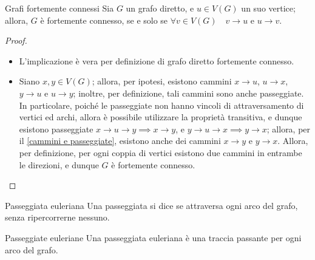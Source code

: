 \documentclass[a4paper, 12pt]{report}
\begin{document}
    \begin{framedlem}{Grafi fortemente connessi}
        Sia $G$ un grafo diretto, e $u \in V(G)$ un suo vertice; allora, $G$ è fortemente connesso, se e solo se $\forall v \in V(G) \quad v \rightarrow u$ e $u \rightarrow v$.
    \end{framedlem}

    \begin{proof}
        \hspace{0.7cm}
        \begin{itemize}
            \item[]  L'implicazione è vera per definizione di grafo diretto fortemente connesso.
            \item[]  Siano $x, y \in V(G)$; allora, per ipotesi, esistono cammini $x \rightarrow u$, $u \rightarrow x$, $y \rightarrow u$ e $u \rightarrow y$; inoltre, per definizione, tali cammini sono anche passeggiate. In particolare, poiché le passeggiate non hanno vincoli di attraversamento di vertici ed archi, allora è possibile utilizzare la proprietà transitiva, e dunque esistono passeggiate $x \rightarrow u \rightarrow y \implies x \rightarrow y$, e $y \rightarrow u \rightarrow x \implies y \rightarrow x$; allora, per il \cref{cammini e passeggiate}, esistono anche dei cammini $x \rightarrow y$ e $y \rightarrow x$. Allora, per definizione, per ogni coppia di vertici esistono due cammini in entrambe le direzioni, e dunque $G$ è fortemente connesso.
        \end{itemize}
    \end{proof}

    \begin{frameddefn}{Passeggiata euleriana}
        Una passeggiata si dice  se attraversa ogni arco del grafo, senza ripercorrerne nessuno.
    \end{frameddefn}

    \begin{framedobs}{Passeggiate euleriane}
        Una passeggiata euleriana è una traccia passante per ogni arco del grafo.
    \end{framedobs}
\end{document}
